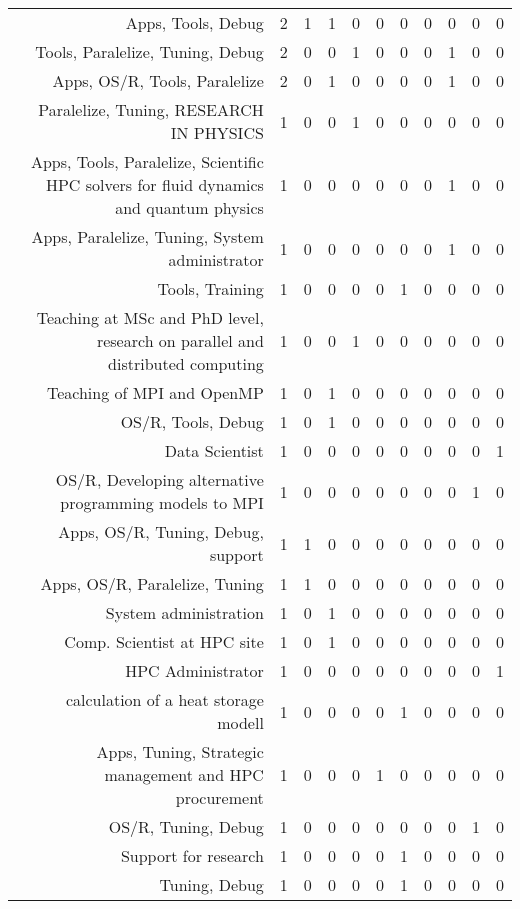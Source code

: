 {\begin{landscape}
\begin{longtable}[htb]{r|c|c|c|c|c|c|c|c|c|c}
{Apps, Tools, Debug} & 2 & 1 & 1 & 0 & 0 & 0 & 0 & 0 & 0 & 0 \\%
{Tools, Paralelize, Tuning, Debug} & 2 & 0 & 0 & 1 & 0 & 0 & 0 & 1 & 0 & 0 \\%
{Apps, OS/R, Tools, Paralelize} & 2 & 0 & 1 & 0 & 0 & 0 & 0 & 1 & 0 & 0 \\%
{Paralelize, Tuning, RESEARCH IN PHYSICS} & 1 & 0 & 0 & 1 & 0 & 0 & 0 & 0 & 0 & 0 \\%
{Apps, Tools, Paralelize, Scientific HPC solvers for fluid dynamics and quantum physics} & 1 & 0 & 0 & 0 & 0 & 0 & 0 & 1 & 0 & 0 \\%
{Apps, Paralelize, Tuning, System administrator} & 1 & 0 & 0 & 0 & 0 & 0 & 0 & 1 & 0 & 0 \\%
{Tools, Training} & 1 & 0 & 0 & 0 & 0 & 1 & 0 & 0 & 0 & 0 \\%
{Teaching at MSc and PhD level, research on parallel and distributed computing} & 1 & 0 & 0 & 1 & 0 & 0 & 0 & 0 & 0 & 0 \\%
{Teaching of MPI and OpenMP} & 1 & 0 & 1 & 0 & 0 & 0 & 0 & 0 & 0 & 0 \\%
{OS/R, Tools, Debug} & 1 & 0 & 1 & 0 & 0 & 0 & 0 & 0 & 0 & 0 \\%
{Data Scientist} & 1 & 0 & 0 & 0 & 0 & 0 & 0 & 0 & 0 & 1 \\%
{OS/R, Developing alternative programming models to MPI} & 1 & 0 & 0 & 0 & 0 & 0 & 0 & 0 & 1 & 0 \\%
{Apps, OS/R, Tuning, Debug, support} & 1 & 1 & 0 & 0 & 0 & 0 & 0 & 0 & 0 & 0 \\%
{Apps, OS/R, Paralelize, Tuning} & 1 & 1 & 0 & 0 & 0 & 0 & 0 & 0 & 0 & 0 \\%
{System administration} & 1 & 0 & 1 & 0 & 0 & 0 & 0 & 0 & 0 & 0 \\%
{Comp. Scientist at HPC site} & 1 & 0 & 1 & 0 & 0 & 0 & 0 & 0 & 0 & 0 \\%
{HPC Administrator} & 1 & 0 & 0 & 0 & 0 & 0 & 0 & 0 & 0 & 1 \\%
{calculation of a heat storage modell} & 1 & 0 & 0 & 0 & 0 & 1 & 0 & 0 & 0 & 0 \\%
{Apps, Tuning, Strategic management and HPC procurement} & 1 & 0 & 0 & 0 & 1 & 0 & 0 & 0 & 0 & 0 \\%
{OS/R, Tuning, Debug} & 1 & 0 & 0 & 0 & 0 & 0 & 0 & 0 & 1 & 0 \\%
{Support for research} & 1 & 0 & 0 & 0 & 0 & 1 & 0 & 0 & 0 & 0 \\%
{Tuning, Debug} & 1 & 0 & 0 & 0 & 0 & 1 & 0 & 0 & 0 & 0 \\%

\end{longtable}
\end{landscape}}
